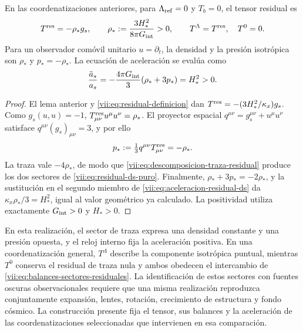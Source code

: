 \begin{theorem}
\label{vii:thm:residual-ds-aceleracion}
En las coordenatizaciones anteriores, para \(\Lambda_{\rm ref}=0\) y \(T_b=0\),
el tensor residual es
\begin{equation}
 T^{\rm res}=-\rho_*g_s,\qquad
 \rho_*:=\frac{3H_*^2}{8\pi G_{\rm int}}>0,
 \qquad T^\Lambda=T^{\rm res},\quad T^0=0.
 \label{vii:eq:residual-ds-puro}
\end{equation}
Para un observador comóvil unitario \(u=\partial_t\), la densidad
y la presión isotrópica son \(\rho_*\) y \(p_*=-\rho_*\).
La ecuación de aceleración se evalúa como
\begin{equation}
 \frac{\ddot a_s}{a_s}
 =-\frac{4\pi G_{\rm int}}3(\rho_*+3p_*)=H_*^2>0.
 \label{vii:eq:aceleracion-residual-ds}
\end{equation}
\end{theorem}
\begin{proof}
El lema anterior y \eqref{vii:eq:residual-definicion} dan
\(T^{\rm res}=-(3H_*^2/\kappa_x)g_s\).
Como \(g_s(u,u)=-1\),
\(T^{\rm res}_{\mu\nu}u^\mu u^\nu=\rho_*\).
El proyector espacial \(q^{\mu\nu}=g_s^{\mu\nu}+u^\mu u^\nu\)
satisface \(q^{\mu\nu}(g_s)_{\mu\nu}=3\), y por ello
\[
 p_*:=\tfrac13q^{\mu\nu}T^{\rm res}_{\mu\nu}=-\rho_*.
\]
La traza vale \(-4\rho_*\), de modo que
\eqref{vii:eq:descomposicion-traza-residual} produce los dos sectores
de \eqref{vii:eq:residual-ds-puro}. Finalmente,
\(\rho_*+3p_*=-2\rho_*\), y la sustitución en el segundo miembro
de \eqref{vii:eq:aceleracion-residual-ds} da
\(\kappa_x\rho_*/3=H_*^2\), igual al valor geométrico ya calculado.
La positividad utiliza exactamente \(G_{\rm int}>0\) y \(H_*>0\).
\end{proof}

En esta realización, el sector de traza expresa una densidad constante
y una presión opuesta, y el reloj interno fija la aceleración positiva.
En una coordenatización general, \(T^\Lambda\) describe la componente isotrópica
puntual, mientras \(T^0\) conserva el residual de traza nula y ambos
obedecen el intercambio de \eqref{vii:eq:balances-sectores-residuales}.
La identificación de estos sectores con fuentes oscuras observacionales
requiere que una misma realización reproduzca conjuntamente expansión,
lentes, rotación, crecimiento de estructura y fondo cósmico. La
construcción presente fija el tensor, sus balances y la aceleración de
las coordenatizaciones seleccionadas que intervienen en esa comparación.
